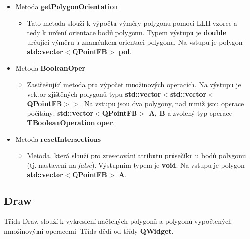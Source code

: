 \documentclass[a4paper, 12pt]{article}
\begin{document}
\begin{itemize}
\begin{itemize}
		\end{itemize}			
	\item Metoda \textbf{getPolygonOrientation}
		\begin{itemize}
			\item Tato metoda slouží k výpočtu výměry polygonu pomocí LLH vzorce a tedy k určení orientace bodů polygonu. Typem výstupu je \textbf{double} určující výměru a znaménkem orientaci polygonu. Na vstupu je polygon \textbf{std::vector$<$QPointFB$>$ pol}.
		\end{itemize}			
	\item Metoda \textbf{BooleanOper}
		\begin{itemize}
			\item Zastřešující metoda pro výpočet množinových operacích. Na výstupu je vektor zjištěných polygonů typu \textbf{std::vector$<$std::vector$<$QPointFB$> >$}. Na vstupu jsou dva polygony, nad nimiž jsou operace počítány: \textbf{std::vector$<$QPointFB$>$ A, B} a zvolený typ operace \textbf{TBooleanOperation oper}. 
		\end{itemize}
	\item Metoda \textbf{resetIntersections}
		\begin{itemize}
			\item Metoda, která slouží pro zresetování atributu průsečíku u bodů polygonu (tj. nastavení na \textit{false}). Výstupním typem je \textbf{void}. Na vstupu je polygon \\ \textbf{std::vector$<$QPointFB$>$ A}. 
		\end{itemize}
\end{itemize}

\subsection{Draw}
Třída Draw slouží k vykreslení načtených polygonů a polygonů vypočtených množinovými operacemi. Třída dědí od třídy \textbf{QWidget}. 
\end{document}
